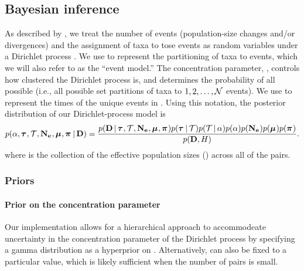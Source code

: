 \subsection{Bayesian inference}

\begin{linenomath}
As described by \citet{Oaks2018ecoevolity},
we treat the number of events (population-size changes and/or divergences)
and the assignment of taxa to tose events as
random variables under a Dirichlet process \citep{Ferguson1973,
    Antoniak1974}.
We use \etimesets to represent the partitioning of taxa to events,
which we will also refer to as the ``event model.''
The concentration parameter, \concentration, controls how clustered the
Dirichlet process is, and determines the probability of all possible \etimesets
(i.e., all possible set partitions of taxa to $1, 2, \ldots, \mathcal{N}$ events).
We use \etimes to represent the times of the unique events in \etimesets.
Using this notation, the posterior distribution of our 
Dirichlet-process model is
\begin{equation}
    \pr(
    \concentration,
    \etimes,
    \etimesets,
    \collectionpopsizes,
    \murates,
    \gfreqs
    \given
    \alldata
    )
    =
    \frac{
        \pr(
        \alldata
        \given
        \etimes,
        \etimesets,
        \collectionpopsizes,
        \murates,
        \gfreqs
        )
        \pr(\etimes \given \etimesets)%
        \pr(\etimesets \given \concentration)
        \pr(\concentration)
        \pr(\collectionpopsizes)
        \pr(\murates)
        \pr(\gfreqs)
    }{
        \pr(
        \alldata,
        \basedistribution
        )
    }.
    \label{eq:bayesruleexpanded}
\end{equation}
where
\collectionpopsizes
is the collection of the effective population sizes (\comparisonpopsizes{})
across all of the pairs.
\end{linenomath}

\subsubsection{Priors}

\paragraph{Prior on the concentration parameter}
Our implementation allows for a hierarchical approach to accommodeate
uncertainty in the concentration parameter of the Dirichlet process
by specifying a gamma distribution as a hyperprior on
\concentration \citep{Escobar1995,Heath2011}.
Alternatively, \concentration can also be fixed to a particular value,
which is likely sufficient when the number of pairs is small.

